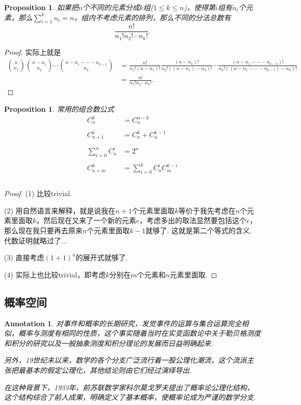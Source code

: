 \documentclass{article}
\newtheorem{proposition}[theorem]{Proposition}
\newtheorem{annotation}[theorem]{Annotation}
\begin{document}
\begin{proposition}
\rm 如果把$n$个不同的元素分成$k$组($1\leq k \leq n$)，使得第$i$组有$n_i$个元素，那么$\sum\limits_{i=1}^k n_i = n$，组内不考虑元素的排列，那么不同的分法总数有
$$
\frac{n!}{n_1!n_2!\cdots n_k!}.
$$
\end{proposition}

\begin{proof}
实际上就是
$$
\begin{array}{ll}
\binom {n}{n_1} \binom{n-n_1}{n_2} \cdots \binom{n-n_1-\cdots-n_{k-1}}{n_k} &= \frac{n!}{n_1!(n-n_1)!} \frac{(n-n_1)!}{n_2!((n-n_1)-n_2)!}\cdots \frac{(n-n_1-\cdots-n_{k-1})!}{n_k!((n-n_1-\cdots-n_{k-1})-n_{k})!} \\
&= \frac{n!}{n_1!n_2\cdots n_k!}.
\end{array}
$$
\end{proof}

\begin{proposition}
\rm {\color{red} 常用的组合数公式}
$$
\begin{array}{rl}
C^k_n &= C^{n-k}_n \\ \\
C^k_{n+1} &= C^k_n + C^{k-1}_n \\ \\
\sum\limits_{i=0}^n C^i_n &= 2^n \\ \\
C^k_{n+m} &= \sum\limits_{i=0}^k C^i_n C^{k-i}_m \\ \\
\end{array}
$$
\end{proposition}

\begin{proof}
(1) 比较trivial.

(2) 用自然语言来解释，就是说我在$n+1$个元素里面取$k$等价于我先考虑在$n$个元素里面取$k$，然后现在又来了一个新的元素$e$，考虑多出的取法显然要包括这个$e$，那么现在我只要再去原来$n$个元素里面取$k-1$就够了. 这就是第二个等式的含义. 代数证明就略过了...

(3) 直接考虑$(1+1)^n$的展开式就够了.

(4) 实际上也比较trivial，即考虑$k$分别在$m$个元素和$n$元素里面取.
\end{proof}

\newpage
\subsection{概率空间}

\begin{annotation}
\rm 对事件和概率的长期研究，发觉事件的运算与集合运算完全相似，概率与测度有相同的性质，这个事实随着当时在实变函数论中关于勒贝格测度和积分的研究以及一般抽象测度和积分理论的发展而日益明确起来. 

另外，19世纪末以来，数学的各个分支广泛流行着一股公理化潮流，这个流派主张把最基本的假定公理化，其他结论则由它们经过演绎导出.

在这种背景下，1933年，前苏联数学家科尔莫戈罗夫提出了概率论公理化结构，这个结构综合了前人成果，明确定义了基本概率，使概率论成为严谨的数学分支.
\end{annotation}
\end{document}
